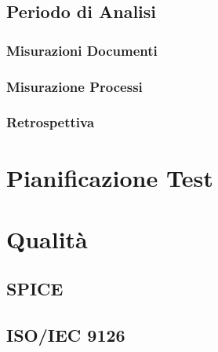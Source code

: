 \documentclass[a4paper, oneside, openany, dvipsnames, table]{article}
\begin{document}
	\subsection{Periodo di Analisi}
	
		\subsubsection{Misurazioni Documenti}
			
		\subsubsection{Misurazione Processi}
			
		\subsubsection{Retrospettiva}
			
\newpage
\section{Pianificazione Test}
	
	
\newpage
\section{Qualità}
	\subsection{SPICE}
		\label{app:SPICE}
		
	\subsection{ISO/IEC 9126}
		\label{app:ISO/IEC 9126}
		
\end{document}
